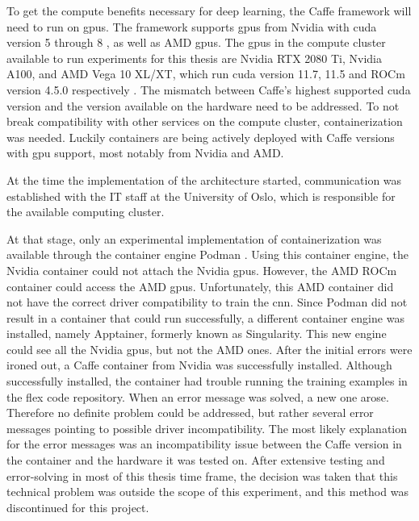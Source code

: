             To get the compute benefits necessary for deep learning, the Caffe framework will need to run on \glspl{gpu}.
            The framework supports \glspl{gpu} from Nvidia with \gls{cuda} version 5 through 8 \cite{CaffeInstallation, CaffeDeepLearning}, as well as AMD \glspl{gpu}. The \glspl{gpu} in the compute cluster available to run experiments for this thesis are Nvidia RTX 2080 Ti, Nvidia A100, and AMD Vega 10 XL/XT, which run \gls{cuda} version 11.7, 11.5 and ROCm version 4.5.0 respectively \cite{MLNodesUniversitetet}. 
            The mismatch between Caffe's highest supported \gls{cuda} version and the version available on the hardware need to be addressed.
            To not break compatibility with other services on the compute cluster, containerization was needed. Luckily containers are being actively deployed with  Caffe versions with \gls{gpu} support, most notably from Nvidia and AMD.


            At the time the implementation of the architecture started, communication was established with the IT staff at the University of Oslo, which is responsible for the available computing cluster.
            
            At that stage, only an experimental implementation of containerization was available through the container engine Podman \cite{Podman}. Using this container engine, the Nvidia container could not attach the Nvidia \glspl{gpu}. However, the AMD ROCm container could access the AMD \glspl{gpu}. Unfortunately, this AMD container did not have the correct driver compatibility to train the \gls{cnn}. Since Podman did not result in a container that could run successfully, a different container engine was installed, namely Apptainer, formerly known as Singularity. This new engine could see all the Nvidia \glspl{gpu}, but not the AMD ones. After the initial errors were ironed out, a Caffe container from Nvidia was successfully installed. Although successfully installed, the container had trouble running the training examples in the \gls{flex} code repository. 
            When an error message was solved, a new one arose.
            Therefore no definite problem could be addressed, but rather several error messages pointing to possible driver incompatibility. 
            The most likely explanation for the error messages was an incompatibility issue between the Caffe version in the container and the hardware it was tested on. After extensive testing and error-solving in most of this thesis time frame, the decision was taken that this technical problem was outside the scope of this experiment, and this method was discontinued for this project. 
            

